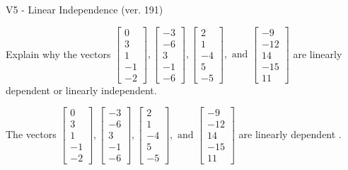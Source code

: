 \begin{exercise}
  \begin{exerciseTitle}V5 - Linear Independence (ver. 191)\end{exerciseTitle}
  \begin{exerciseStatement}
    Explain why the vectors \(\left[\begin{array}{r}
0 \\
3 \\
1 \\
-1 \\
-2
\end{array}\right] , \left[\begin{array}{r}
-3 \\
-6 \\
3 \\
-1 \\
-6
\end{array}\right] , \left[\begin{array}{r}
2 \\
1 \\
-4 \\
5 \\
-5
\end{array}\right] , \text{ and } \left[\begin{array}{r}
-9 \\
-12 \\
14 \\
-15 \\
11
\end{array}\right]\) are linearly dependent or linearly independent.	


  \end{exerciseStatement}
  \begin{exerciseAnswer}
   The vectors \(\left[\begin{array}{r}
0 \\
3 \\
1 \\
-1 \\
-2
\end{array}\right] , \left[\begin{array}{r}
-3 \\
-6 \\
3 \\
-1 \\
-6
\end{array}\right] , \left[\begin{array}{r}
2 \\
1 \\
-4 \\
5 \\
-5
\end{array}\right] , \text{ and } \left[\begin{array}{r}
-9 \\
-12 \\
14 \\
-15 \\
11
\end{array}\right]\) are 
  	 linearly dependent  .
  


  \end{exerciseAnswer}
\end{exercise}